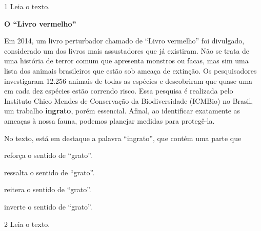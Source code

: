 \pagebreak
\vspace*{-3.4cm}
\pagebreak

\num{1} Leia o texto.

\begin{myquote}
\textbf{O ``Livro vermelho''}

Em 2014, um livro perturbador chamado de ``Livro vermelho'' foi divulgado, considerado um dos livros mais assustadores que já existiram. Não se trata de uma história de terror comum que apresenta monstros ou facas, mas sim uma lista dos animais brasileiros que estão sob ameaça de extinção. Os pesquisadores investigaram 12.256 animais de todas as espécies e descobriram que quase uma em cada dez espécies estão correndo risco. Essa pesquisa é realizada pelo Instituto Chico Mendes de Conservação da Biodiversidade (ICMBio) no Brasil, um trabalho \textbf{ingrato}, porém essencial. Afinal, ao identificar exatamente as ameaças à nossa fauna, podemos planejar medidas para protegê-la.

\end{myquote}

No texto, está em destaque a palavra ``ingrato'', que contém uma parte que

\begin{escolha}
\item reforça o sentido de ``grato''.

\item ressalta o sentido de ``grato''.

\item reitera o sentido de ``grato''.

\item inverte o sentido de ``grato''.
\end{escolha}

\num{2} Leia o texto.

